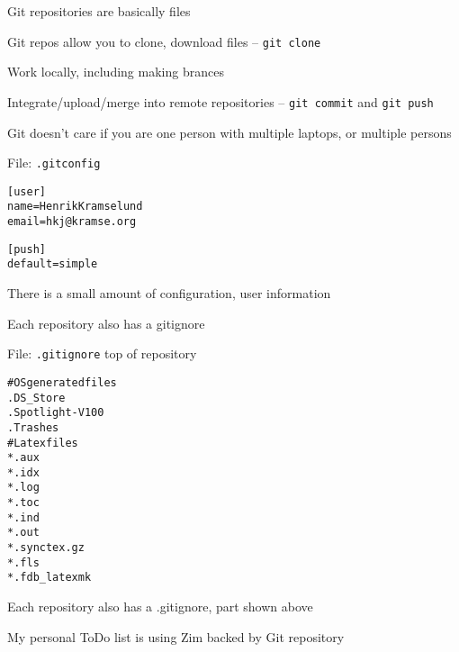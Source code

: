 \documentclass[Screen16to9,17pt]{foils}
\begin{document}

\begin{list2}
\item Git repositories are basically files
\item Git repos allow you to clone, download files -- \verb+git clone+
\item Work locally, including making brances
\item Integrate/upload/merge into remote repositories -- \verb+git commit+ and \verb+git push+
\item Git doesn't care if you are one person with multiple laptops, or multiple persons
\end{list2}





File: \verb+.gitconfig+
\begin{alltt}
  [user]
  	name = Henrik Kramselund  
  	email = hkj@kramse.org

  [push]
  	default = simple
\end{alltt}

\begin{list2}
\item There is a small amount of configuration, user information
\item Each repository also has a gitignore
\end{list2}



File: \verb+.gitignore+ top of repository
\begin{alltt}\footnotesize
  # OS generated files
  .DS_Store
  .Spotlight-V100
  .Trashes
  # Latex files
  *.aux
  *.idx
  *.log
  *.toc
  *.ind
  *.out
  *.synctex.gz
  *.fls
  *.fdb_latexmk

\end{alltt}

\begin{list2}
\item Each repository also has a .gitignore, part shown above
\end{list2}





\begin{list2}
\item My personal ToDo list is using Zim backed by Git repository
\item {}
\end{list2}
\end{document}
